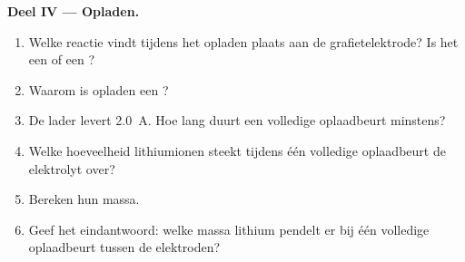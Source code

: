 \begin{problem}
\medskip
\noindent\textbf{Deel IV --- Opladen.}
\begin{enumerate}[resume]
  \item Welke reactie vindt tijdens het opladen plaats aan de
        grafietelektrode? Is het een  of een ?
  \item Waarom is opladen een ?
  \item De lader levert \qty{2.0}{A}. Hoe lang duurt een volledige
        oplaadbeurt minstens?
  \item Welke hoeveelheid lithiumionen steekt tijdens één volledige
        oplaadbeurt de elektrolyt over?
  \item Bereken hun massa.
  \item Geef het eindantwoord: welke massa lithium pendelt er bij één
        volledige oplaadbeurt tussen de elektroden?
\end{enumerate}
\end{problem}
